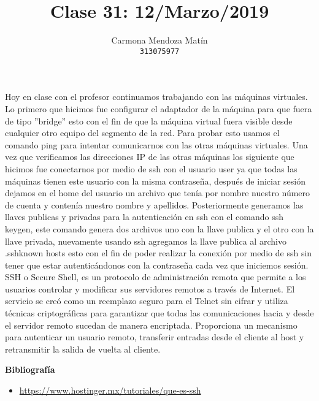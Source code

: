 \documentclass[11pt, a4paper]{report}
\begin{document}
\title{Clase 31: 12/Marzo/2019}
\author{
  Carmona Mendoza Mat\'in\\
  \texttt{313075977}
}
\date{}
\maketitle

Hoy en clase con el profesor continuamos trabajando con las máquinas
virtuales. Lo primero que hicimos fue configurar el adaptador de la máquina para
que fuera de tipo ”bridge” esto con el fin de que la máquina virtual fuera
visible desde cualquier otro equipo del segmento de la red. Para probar esto
usamos el comando ping para intentar comunicarnos con las otras máquinas
virtuales.
Una vez que verificamos las direcciones IP de las otras máquinas los siguiente
que hicimos fue conectarnos por medio de ssh con el usuario user ya que todas
las máquinas tienen este usuario con la misma contraseña, después de iniciar
sesión dejamos en el home del usuario un archivo que tenía por nombre nuestro
número de cuenta y contenía nuestro nombre y apellidos.
Posteriormente generamos las llaves publicas y privadas para la autenticación
en ssh con el comando ssh keygen, este comando genera dos archivos uno con
la llave publica y el otro con la llave privada, nuevamente usando ssh
agregamos la llave publica al archivo \/.ssh\/known hosts esto con el fin de
poder
realizar la conexión por medio de ssh sin tener que estar autenticándonos con
la contraseña cada vez que iniciemos sesión. \\

SSH o Secure Shell, es un protocolo de administración remota que permite a los
usuarios controlar y modificar sus servidores remotos a través de Internet. El
servicio se creó como un reemplazo seguro para el Telnet sin cifrar y utiliza
técnicas criptográficas para garantizar que todas las comunicaciones hacia y
desde el servidor remoto sucedan de manera encriptada. Proporciona un mecanismo
para autenticar un usuario remoto, transferir entradas desde el cliente al host
y retransmitir la salida de vuelta al cliente.



\newpage

\textbf{Bibliografía} \\

\begin{itemize}

\item \url{https://www.hostinger.mx/tutoriales/que-es-ssh}
\end{itemize}
\end{document}
